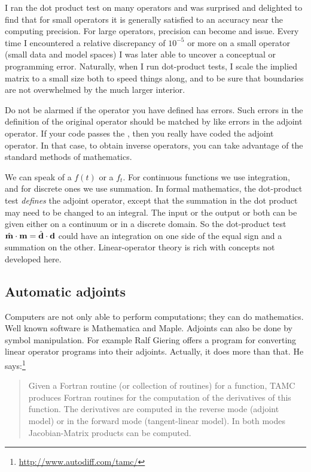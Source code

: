 
\par
I ran the dot product test on many operators
and was surprised and delighted to find
that for small operators
it is generally satisfied to an accuracy near the computing precision.
For large operators, precision can become and issue.
Every time I encountered a relative discrepancy of $10^{-5}$ or more
on a small operator (small data and model spaces)
I was later able to uncover a conceptual or programming error.
Naturally,
when I run dot-product tests, I scale the implied matrix to a
small size both
to speed things along, and to be sure that
boundaries are not overwhelmed by the much larger interior.

\par
Do not be alarmed if the operator you have defined has  errors.
Such errors in the definition of the original operator
should be matched by
like errors in the adjoint operator.
If your code passes the ,
then you really have coded the adjoint operator.
In that case,
to obtain inverse operators,
you can take advantage of the standard methods of mathematics.

\par
We can speak of a  $f(t)$
or a  $f_t$.
For continuous functions we use integration,
and for discrete ones we use summation.
In formal mathematics, the dot-product test 
{\em  defines} the adjoint operator,
except that the summation in the dot product
may need to be changed to an integral.
The input or the output or both can be given
either on a continuum or in a discrete domain.
So the dot-product test
$\hat {\bold m} \cdot \bold m  =
\hat {\bold d} \cdot \bold d
$
could have an integration on one side of the equal sign
and a summation on the other.
Linear-operator theory is rich with concepts not developed here.


\subsection{Automatic adjoints}
Computers are not only able to perform computations;
they can do mathematics.
Well known software is Mathematica and Maple.
Adjoints can also be done by symbol manipulation.
For example Ralf Giering
offers a program for converting
linear operator programs into their adjoints.
Actually, it does more than that.
He says:\footnote{\url{http://www.autodiff.com/tamc/}}
\begin{quote}
Given a Fortran routine (or collection of routines) for a function,
TAMC produces Fortran routines for the computation
of the derivatives of this function.
The derivatives are computed in the reverse mode (adjoint model)
or in the forward mode (tangent-linear model).
In both modes Jacobian-Matrix products can be computed.
\end{quote}


